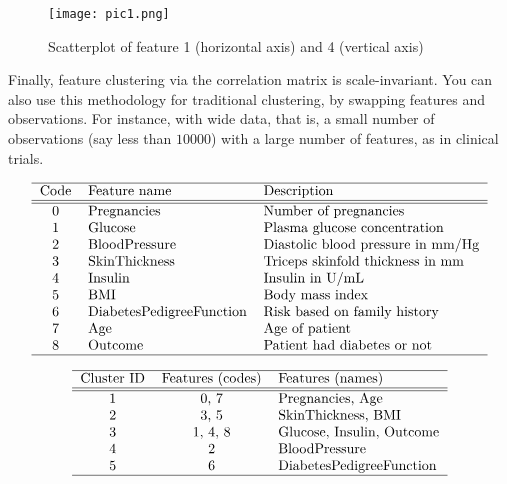 \documentclass[oneside,10pt]{book}
\renewcommand{\arraystretch}{1.4} %
\begin{document}
\begin{figure}[H]
\centering
\texttt{[image: pic1.png]}  
\caption{Scatterplot of feature 1 (horizontal axis) and 4 (vertical axis)}
\label{fig:pihggf}
\end{figure}

Finally, feature clustering via the correlation matrix is scale-invariant. You can also use this methodology for traditional clustering, by swapping features and observations. For instance, with 
\textcolor{index}{wide data}, that is, a small number of observations (say less than $\num{10000}$) with a large number of features, as in clinical trials. 

\renewcommand{\arraystretch}{1.2} %
\renewcommand{\arraystretch}{1.2} %
\begin{table}[H]
\[
\begin{tabular}{cll}
\hline
 Code &  Feature name & Description  \\
\hline
\hline
 0 & Pregnancies & Number of pregnancies \\
 1 & Glucose & Plasma glucose concentration\\
 2 & BloodPressure &  Diastolic blood pressure in mm/Hg \\
 3 & SkinThickness &  Triceps skinfold thickness in mm\\
4 &  Insulin & Insulin in U/mL\\
5 &  BMI & Body mass index \\
6 &  DiabetesPedigreeFunction & Risk based on family history\\
7 & Age & Age of patient\\
8 & Outcome & Patient had diabetes  or not \\
\hline
\end{tabular}
\]
\caption{\label{tabebbphuyfr} Feature mapping table, medical dataset}
\end{table}

\renewcommand{\arraystretch}{1.2} %
\renewcommand{\arraystretch}{1.2} %
\begin{table}[H]
\[
\begin{tabular}{ccl}
\hline
 Cluster ID &  Features (codes) & Features (names)  \\
\hline
\hline
 1 & 0, 7 & Pregnancies, Age   \\
 2 & 3, 5 & SkinThickness, BMI  \\
 3 & 1, 4, 8 & Glucose, Insulin, Outcome  \\
 4 & 2  & BloodPressure  \\
 5 &  6 & DiabetesPedigreeFunction \\
\hline
\end{tabular}
\]
\caption{\label{tabebbph12huy} Feature clusters}
\end{table}
\end{document}
